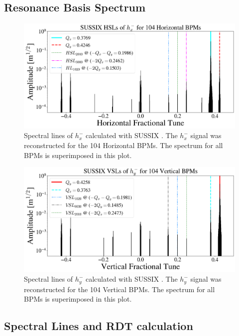 \subsection{Resonance Basis Spectrum}

\begin{figure}[H]
    \centering
    \includegraphics[width=\columnwidth]{chapter4/hxspect.png}
    \caption{Spectral lines of $h_x^{-}$ calculated with SUSSIX \cite{sussix}. The $h_x^{-}$ signal was reconstructed for the 104 Horizontal BPMs. The spectrum for all BPMs is superimposed in this plot.}
    \label{fig:hxspect1}
\end{figure}

\begin{figure}[H]
    \centering
    \includegraphics[width=\columnwidth]{chapter4/hyspect.png}
    \caption{Spectral lines of $h_y^{-}$ calculated with SUSSIX \cite{sussix}. The $h_y^{-}$ signal was reconstructed for the 104 Vertical BPMs. The spectrum for all BPMs is superimposed in this plot.}
    \label{fig:hyspect1}
\end{figure}

\subsection{Spectral Lines and RDT calculation}

